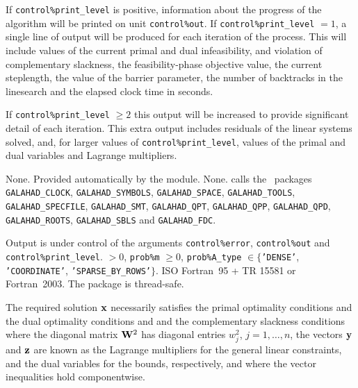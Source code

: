 \documentclass{galahad}
\newcommand{\packagename}{LSQP}
\begin{document}

\galinfo
If {\tt control\%print\_level} is positive, information about the progress 
of the algorithm will be printed on unit {\tt control\-\%out}.
If {\tt control\%print\_level} $= 1$, a single line of output will be produced 
for each iteration of the process. 
This will include values of the current primal and dual infeasibility, and
violation of complementary slackness, the feasibility-phase objective value,
the current steplength, the value of the barrier parameter, the
number of backtracks in the linesearch and the elapsed clock time in seconds.

If {\tt control\%print\_level} $\geq 2$ this 
output will be increased to provide significant detail of each iteration. 
This extra output includes residuals of the linear systems solved, and,
for larger values of {\tt control\%print\_level}, values of the primal and dual
variables and Lagrange multipliers. 


\galgeneral

\galcommon None.
\galworkspace Provided automatically by the module.
\galroutines None. 
\galmodules {\tt \packagename\_solve} calls the \galahad\ packages
\sloppy
{\tt GALAHAD\_\-CLOCK},
{\tt GALAHAD\_SY\-M\-BOLS}, 
{\tt GALAHAD\_SPACE}, 
{\tt GALAHAD\_TOOLS}, 
{\tt GALAHAD\_SPECFILE}, 
{\tt GALAHAD\_SMT}, 
{\tt GALAHAD\_QPT}, 
{\tt GALAHAD\_QPP}, 
{\tt GALAHAD\_QPD}, 
{\tt GALAHAD\_ROOTS}, 
{\tt GALAHAD\_SBLS}
and
{\tt GALAHAD\_FDC}.

\galio Output is under control of the arguments
 {\tt control\%error}, {\tt control\%out} and {\tt control\%print\_level}.
 $> 0$, {\tt prob\%m} $\geq  0$, 
{\tt prob\%A\_type} $\in \{${\tt 'DENSE'}, 
 {\tt 'COORDINATE'}, {\tt 'SPARSE\_BY\_ROWS'}$\}$. 
\galportability ISO Fortran~95 + TR 15581 or Fortran~2003. 
The package is thread-safe.


\galmethod
The required solution ${\mathbf{x}}$ necessarily satisfies 
the primal optimality conditions
and 
the dual optimality conditions
and 
and the complementary slackness conditions 
where the diagonal matrix ${\mathbf{W}}^{2}$ has diagonal entries $w_{j}^{2}$,
$j = 1, \ldots ,n$, the vectors ${\mathbf{y}}$ and ${\mathbf{z}}$ are 
known as the Lagrange multipliers for
the general linear constraints, and the dual variables for the bounds,
respectively, and where the vector inequalities hold componentwise.
\end{document}
